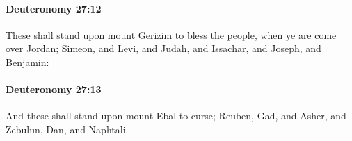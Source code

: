 		\paragraph{Deuteronomy 27:12} %
			\label{DEUTERONOMY-27-12}

			These shall stand upon mount Gerizim to bless the people, when ye are come over Jordan; Simeon, and Levi, and Judah, and Issachar, and Joseph, and Benjamin:


		\paragraph{Deuteronomy 27:13} %
			\label{DEUTERONOMY-27-13}

			And these shall stand upon mount Ebal to curse; Reuben, Gad, and Asher, and Zebulun, Dan, and Naphtali.


